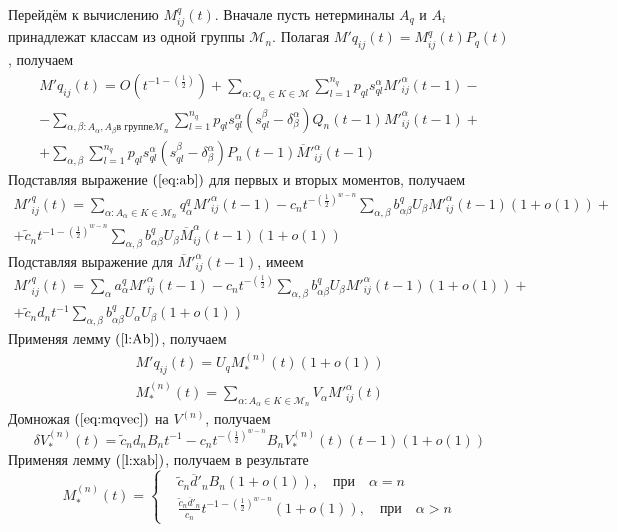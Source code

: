 \documentclass[12pt]{article}
\begin{document}
{Перейдём к вычислению $M^q_{ij}(t)$. Вначале пусть нетерминалы $A_q$ и $A_i$ принадлежат классам из одной группы $\mathcal{M}_n$. Полагая $M'q_{ij}(t) = M^q_{ij}(t) P_q(t)$, получаем
\begin{multline*}
	M'q_{ij}(t) = O(t^{-1 -\left(\frac{1}{2}\right)}) + \sum_{\alpha : Q_\alpha \in K \in \mathcal{M}} \sum_{l=1}^{n_q} p_{ql} s_{ql}^\alpha M'^\alpha_{ij}(t-1) - \\
	- \sum_{\alpha,\beta : A_\alpha, A_\beta \text{в группе} \mathcal{M}_n} \sum_{l=1}^{n_q} p_{ql} s_{ql}^\alpha (s_{ql}^\beta - \delta^\alpha_\beta) Q_n(t-1) M'^\alpha_{ij}(t-1) + \\
	+ \sum_{\alpha,\beta} \sum_{l=1}^{n_q} p_{ql} s_{ql}^\alpha (s_{ql}^\beta - \delta^\alpha_\beta) P_n(t-1) \overline{M}'^\alpha_{ij}(t-1)
\end{multline*}
Подставляя выражение $(\ref{eq:ab})$ для первых и вторых моментов, получаем
\begin{multline*}
	M'^q_{ij}(t) = \sum_{\alpha : A_\alpha \in K \in \mathcal{M}_n} q^q_\alpha M'^\alpha_{ij}(t-1) - c_n t^{-\left(\frac{1}{2}\right)^{w-n}} \sum_{\alpha,\beta} b^q_{\alpha \beta} U_\beta M'^\alpha_{ij}(t-1) (1 + o(1)) + \\
	+ \tilde{c}_n t^{-1 - \left(\frac{1}{2}\right)^{w-n}} \sum_{\alpha,\beta} b^q_{\alpha \beta} U_\beta \overline{M}^\alpha_{ij}(t-1) (1 + o(1))
\end{multline*}
Подставляя выражение для $\overline{M}'^\alpha_{ij}(t-1)$, имеем
\begin{multline}
\label{eq:mqvec}
	M'^q_{ij}(t) = \sum_{\alpha} a^q_\alpha M'^\alpha_{ij}(t-1) - c_n t^{-\left(\frac{1}{2}\right)} \sum_{\alpha,\beta} b^q_{\alpha \beta} U_\beta M'^\alpha_{ij}(t-1) (1 + o(1)) + \\
	+ \tilde{c}_n d_n t^{-1} \sum_{\alpha,\beta} b^q_{\alpha \beta} U_\alpha U_\beta (1 + o(1))
\end{multline}
Применяя лемму $(\ref{l:Ab})$, получаем
\begin{equation*}
	\begin{split}
		M'q_{ij}(t) = U_q M^{(n)}_*(t) (1 + o(1)) \\
		M^{(n)}_*(t) = \sum_{\alpha : A_\alpha \in K \in \mathcal{M}_n} V_\alpha M'^\alpha_{ij}(t)
	\end{split}
\end{equation*}
Домножая $(\ref{eq:mqvec})$ на $V^{(n)}$, получаем
\begin{equation*}
	\delta V^{(n)}_*(t) = \tilde{c}_n d_n B_n t^{-1} - c_n t^{-\left(\frac{1}{2}\right)^{w-n}} B_n V^{(n)}_*(t)(t-1) (1 + o(1))
\end{equation*}
Применяя лемму $(\ref{l:xab})$, получаем в результате
\begin{equation*}
	M^{(n)}_*(t) = \left\{
	\begin{split}
		&\tilde{c}_n \overline{d}'_n B_n (1 + o(1)),\quad \text{при}\quad \alpha = n \\
		&\frac{\tilde{c}_n \overline{d}'_n}{c_n} t^{-1 -\left(\frac{1}{2}\right)^{w-n}} (1 + o(1)),\quad \text{при}\quad \alpha > n
	\end{split}
	\right.
\end{equation*}

}
\end{document}
